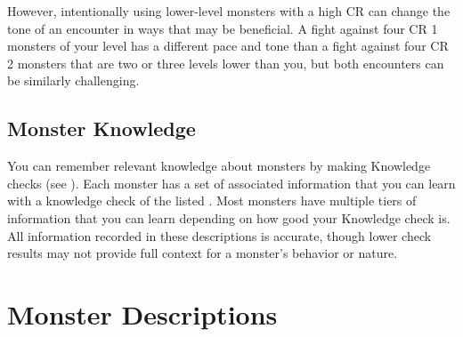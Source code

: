         However, intentionally using lower-level monsters with a high CR can change the tone of an encounter in ways that may be beneficial.
        A fight against four CR 1 monsters of your level has a different pace and tone than a fight against four CR 2 monsters that are two or three levels lower than you, but both encounters can be similarly challenging.

    \subsection{Monster Knowledge}
        You can remember relevant knowledge about monsters by making Knowledge checks (see ).
        Each monster has a set of associated information that you can learn with a knowledge check of the listed .
        Most monsters have multiple tiers of information that you can learn depending on how good your Knowledge check is.
        All information recorded in these descriptions is accurate, though lower check results may not provide full context for a monster's behavior or nature.

\section{Monster Descriptions}


